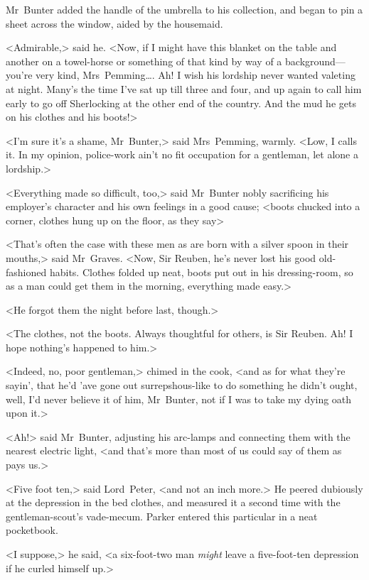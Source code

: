 Mr~Bunter added the handle of the umbrella to his collection, and began to pin a sheet across the window, aided by the housemaid.

<Admirable,> said he. <Now, if I might have this blanket on the table and another on a towel-horse or something of that kind by way of a background—you're very kind, Mrs~Pemming\dots . Ah! I wish his lordship never wanted valeting at night. Many's the time I've sat up till three and four, and up again to call him early to go off Sherlocking at the other end of the country. And the mud he gets on his clothes and his boots!>

<I'm sure it's a shame, Mr~Bunter,> said Mrs~Pemming, warmly. <Low, I calls it. In my opinion, police-work ain't no fit occupation for a gentleman, let alone a lordship.>

<Everything made so difficult, too,> said Mr~Bunter nobly sacrificing his employer's character and his own feelings in a good cause; <boots chucked into a corner, clothes hung up on the floor, as they say\longdash>

<That's often the case with these men as are born with a silver spoon in their mouths,> said Mr~Graves. <Now, Sir Reuben, he's never lost his good old-fashioned habits. Clothes folded up neat, boots put out in his dressing-room, so as a man could get them in the morning, everything made easy.>

<He forgot them the night before last, though.>

<The clothes, not the boots. Always thoughtful for others, is Sir Reuben. Ah! I hope nothing's happened to him.>

<Indeed, no, poor gentleman,> chimed in the cook, <and as for what they're sayin', that he'd 'ave gone out surrepshous-like to do something he didn't ought, well, I'd never believe it of him, Mr~Bunter, not if I was to take my dying oath upon it.>

<Ah!> said Mr~Bunter, adjusting his arc-lamps and connecting them with the nearest electric light, <and that's more than most of us could say of them as pays us.>

<Five foot ten,> said Lord~Peter, <and not an inch more.> He peered dubiously at the depression in the bed clothes, and measured it a second time with the gentleman-scout's vade-mecum. Parker entered this particular in a neat pocketbook.

<I suppose,> he said, <a six-foot-two man \emph{might} leave a five-foot-ten depression if he curled himself up.>

